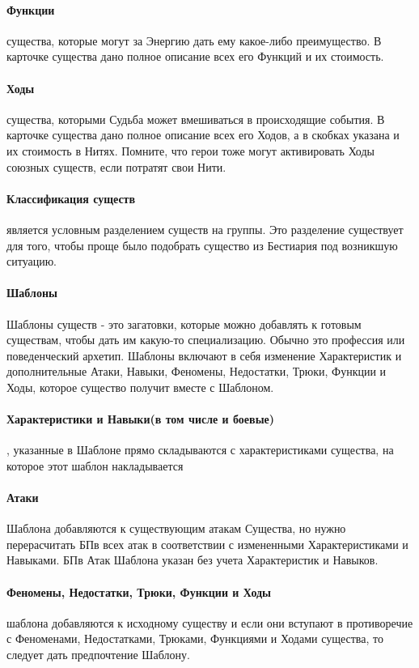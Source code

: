 \paragraph{Функции} существа, которые могут за Энергию дать ему какое-либо преимущество. В карточке существа дано полное описание всех его Функций и их стоимость.
\paragraph{Ходы} существа, которыми Судьба может вмешиваться в происходящие события. В карточке существа дано полное описание всех его Ходов, а в скобках указана и их стоимость в Нитях. Помните, что герои тоже могут активировать Ходы союзных существ, если потратят свои Нити.
\paragraph{Классификация существ} является условным разделением существ на группы. Это разделение существует для того, чтобы проще было подобрать существо из Бестиария под возникшую ситуацию.

\paragraph{Шаблоны}
Шаблоны существ - это загатовки, которые можно добавлять к готовым существам, чтобы дать им какую-то специализацию. Обычно это профессия или поведенческий архетип.
\newline Шаблоны включают в себя изменение Характеристик и дополнительные Атаки, Навыки, Феномены, Недостатки, Трюки, Функции и Ходы, которое существо получит вместе с Шаблоном.
\paragraph{Характеристики и Навыки(в том числе и боевые)}, указанные в Шаблоне прямо складываются с характеристиками существа, на которое этот шаблон накладывается
\paragraph{Атаки} Шаблона добавляются к существующим атакам Существа, но нужно перерасчитать БПв всех атак в соответствии с измененными Характеристиками и Навыками. БПв Атак Шаблона указан без учета Характеристик и Навыков.
\paragraph{Феномены, Недостатки, Трюки, Функции и Ходы} шаблона добавляются к исходному существу и если они вступают в противоречие с Феноменами, Недостатками, Трюками, Функциями и Ходами существа, то следует дать предпочтение Шаблону.

